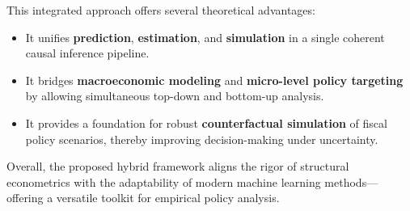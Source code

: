 This integrated approach offers several theoretical advantages:

\begin{itemize}
    \item It unifies \textbf{prediction}, \textbf{estimation}, and \textbf{simulation} in a single coherent causal inference pipeline.
    \item It bridges \textbf{macroeconomic modeling} and \textbf{micro-level policy targeting} by allowing simultaneous top-down and bottom-up analysis.
    \item It provides a foundation for robust \textbf{counterfactual simulation} of fiscal policy scenarios, thereby improving decision-making under uncertainty.
\end{itemize}

Overall, the proposed hybrid framework aligns the rigor of structural econometrics with the adaptability of modern machine learning methods—offering a versatile toolkit for empirical policy analysis.
